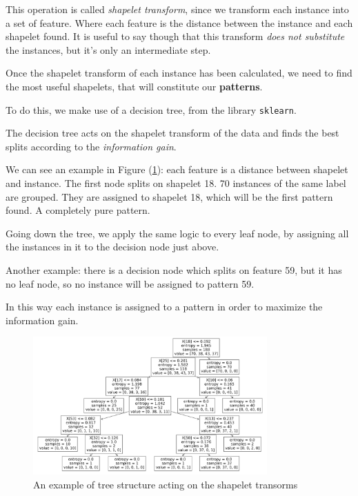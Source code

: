 This operation is called \textit{shapelet transform}, since we transform each instance into a set of feature. 
Where each feature is the distance between the instance and each shapelet found. It is useful to say though that 
this transform \textit{does not substitute} the instances, but it's only an intermediate step.

Once the shapelet transform of each instance has been calculated, we need to find the most useful shapelets, that
will constitute our \textbf{patterns}.

To do this, we make use of a decision tree, from the library \texttt{sklearn}.

The decision tree acts on the shapelet transform of the data and finds the best splits according to the 
\textit{information gain}.

We can see an example in Figure (\ref{fig:tree}): each feature is a distance between
shapelet and instance. The first node splits on shapelet 18. 70 instances of the 
same label are grouped. They are assigned to shapelet 18, which will be the first
pattern found. A completely pure pattern.

Going down the tree, we apply the same logic to every leaf node, by assigning all 
the instances in it to the decision node just above.

Another example: there is a decision node which splits on feature 59, but it has
no leaf node, so no instance will be assigned to pattern 59.

In this way each instance is assigned to a pattern in order to maximize the 
information gain.

\begin{figure}
    \centering
    \includegraphics[width=0.80\textwidth]{tree.png}
    \caption{An example of tree structure acting on the shapelet transorms}
    \label{fig:tree}
\end{figure}


